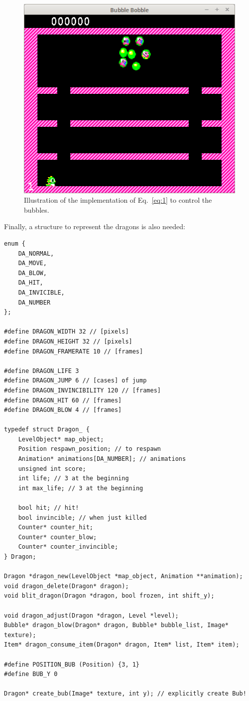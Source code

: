 \documentclass[12pt,a4paper]{article}
\begin{document}
\begin{figure}[!h]
\centering
\includegraphics[width=.6\linewidth]{i/screen6}
\caption{Illustration of the implementation of Eq.~\ref{eq:1} to control the bubbles.}
\label{fig:def:bubs}
\end{figure}

Finally, a structure to represent the dragons is also needed:

\begin{verbatim}
enum {
    DA_NORMAL,
    DA_MOVE,
    DA_BLOW,
    DA_HIT,
    DA_INVICIBLE,
    DA_NUMBER
};

#define DRAGON_WIDTH 32 // [pixels]
#define DRAGON_HEIGHT 32 // [pixels]
#define DRAGON_FRAMERATE 10 // [frames]

#define DRAGON_LIFE 3
#define DRAGON_JUMP 6 // [cases] of jump
#define DRAGON_INVINCIBILITY 120 // [frames]
#define DRAGON_HIT 60 // [frames]
#define DRAGON_BLOW 4 // [frames]

typedef struct Dragon_ {
    LevelObject* map_object;
    Position respawn_position; // to respawn
    Animation* animations[DA_NUMBER]; // animations
    unsigned int score;
    int life; // 3 at the beginning
    int max_life; // 3 at the beginning

    bool hit; // hit!
    bool invincible; // when just killed
    Counter* counter_hit;
    Counter* counter_blow;
    Counter* counter_invincible;
} Dragon;

Dragon *dragon_new(LevelObject *map_object, Animation **animation);
void dragon_delete(Dragon* dragon);
void blit_dragon(Dragon *dragon, bool frozen, int shift_y);

void dragon_adjust(Dragon *dragon, Level *level);
Bubble* dragon_blow(Dragon* dragon, Bubble* bubble_list, Image* texture);
Item* dragon_consume_item(Dragon* dragon, Item* list, Item* item);

#define POSITION_BUB (Position) {3, 1}
#define BUB_Y 0

Dragon* create_bub(Image* texture, int y); // explicitly create Bub!
\end{verbatim}
\end{document}
